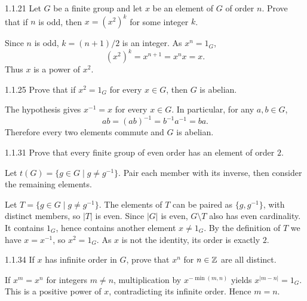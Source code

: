 \documentclass[11pt,oneside]{article}
\begin{document}

\begin{exercise}{1.1.21}
Let $G$ be a finite group and let $x$ be an element of $G$ of order $n$. Prove that if $n$ is odd, then $x=(x^2)^k$ for some integer $k$.
\end{exercise}

\begin{solution}
Since $n$ is odd, $k=(n+1)/2$ is an integer. As $x^n=1_G$,
\[
 (x^2)^k=x^{n+1}=x^nx=x.
\]
Thus $x$ is a power of $x^2$.
\end{solution}

\begin{exercise}{1.1.25}
Prove that if $x^2=1_G$ for every $x\in G$, then $G$ is abelian.
\end{exercise}

\begin{solution}
The hypothesis gives $x^{-1}=x$ for every $x\in G$. In particular, for any $a,b\in G$,
\[
 ab=(ab)^{-1}=b^{-1}a^{-1}=ba.
\]
Therefore every two elements commute and $G$ is abelian.
\end{solution}

\begin{exercise}{1.1.31}
Prove that every finite group of even order has an element of order $2$.
\end{exercise}

\begin{hint}
Let $t(G)=\{g\in G\mid g\neq g^{-1}\}$. Pair each member with its inverse, then consider the remaining elements.
\end{hint}

\begin{solution}
Let $T=\{g\in G\mid g\ne g^{-1}\}$. The elements of $T$ can be paired as $\{g,g^{-1}\}$, with distinct members, so $|T|$ is even. Since $|G|$ is even, $G\setminus T$ also has even cardinality. It contains $1_G$, hence contains another element $x\ne1_G$. By the definition of $T$ we have $x=x^{-1}$, so $x^2=1_G$. As $x$ is not the identity, its order is exactly $2$.
\end{solution}

\begin{exercise}{1.1.34}
If $x$ has infinite order in $G$, prove that $x^n$ for $n\in\mathbb{Z}$ are all distinct.
\end{exercise}

\begin{solution}
If $x^m=x^n$ for integers $m\ne n$, multiplication by $x^{-\min(m,n)}$ yields $x^{|m-n|}=1_G$. This is a positive power of $x$, contradicting its infinite order. Hence $m=n$.
\end{solution}
\end{document}
